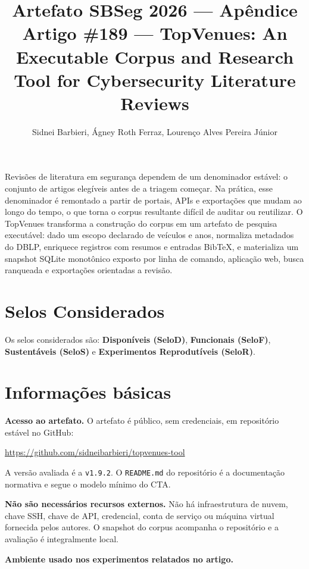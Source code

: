 \documentclass[12pt]{article}
\title{Artefato SBSeg 2026 --- Apêndice\\
Artigo \#189 --- TopVenues: An Executable Corpus and Research Tool for
Cybersecurity Literature Reviews}
\author{Sidnei Barbieri, Ágney Roth Ferraz, Lourenço Alves Pereira Júnior}
\begin{document}
\maketitle

\begin{resumo}
Revisões de literatura em segurança dependem de um denominador estável: o
conjunto de artigos elegíveis antes de a triagem começar. Na prática, esse
denominador é remontado a partir de portais, APIs e exportações que mudam ao
longo do tempo, o que torna o corpus resultante difícil de auditar ou reutilizar.
O TopVenues transforma a construção do corpus em um artefato de pesquisa
executável: dado um escopo declarado de veículos e anos, normaliza metadados do
DBLP, enriquece registros com resumos e entradas BibTeX, e materializa um
snapshot SQLite monotônico exposto por linha de comando, aplicação web, busca
ranqueada e exportações orientadas a revisão.
\end{resumo}

\section{Selos Considerados}

Os selos considerados são: \textbf{Disponíveis (SeloD)}, \textbf{Funcionais
(SeloF)}, \textbf{Sustentáveis (SeloS)} e \textbf{Experimentos Reprodutíveis
(SeloR)}.

\section{Informações básicas}

\textbf{Acesso ao artefato.} O artefato é público, sem credenciais, em
repositório estável no GitHub:

\begin{center}
\url{https://github.com/sidneibarbieri/topvenues-tool}
\end{center}

\noindent A versão avaliada é a \texttt{v1.9.2}. O \texttt{README.md} do
repositório é a documentação normativa e segue o modelo mínimo do CTA.

\textbf{Não são necessários recursos externos.} Não há infraestrutura de nuvem,
chave SSH, chave de API, credencial, conta de serviço ou máquina virtual
fornecida pelos autores. O snapshot do corpus acompanha o repositório e a
avaliação é integralmente local.

\textbf{Ambiente usado nos experimentos relatados no artigo.}
\end{document}
